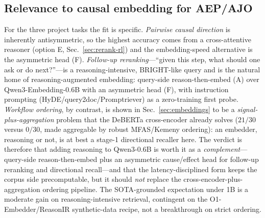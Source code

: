 \subsection{Relevance to causal embedding for AEP/AJO}
For the three project tasks the fit is specific. \emph{Pairwise causal direction} is
inherently antisymmetric, so the highest accuracy comes from a cross-attentive reasoner
(option E, Sec.~\ref{sec:rerank-rl}) and the embedding-speed alternative is the
asymmetric head (F). \emph{Follow-up reranking}---``given this step, what should one ask
or do next?''---is a reasoning-intensive, BRIGHT-like query and is the natural home of
reasoning-augmented embedding: query-side reason-then-embed (A) over Qwen3-Embedding-0.6B
with an asymmetric head (F), with instruction prompting (HyDE/query2doc/Promptriever) as
a zero-training first probe. \emph{Workflow ordering}, by contrast, is shown in
Sec.~\ref{sec:embeddings} to be a \emph{signal-plus-aggregation} problem that the
DeBERTa cross-encoder already solves ($21/30$ versus $0/30$, made aggregable by robust
MFAS/Kemeny ordering): an embedder, reasoning or not, is at best a stage-1 directional
recaller here. The verdict is therefore that adding reasoning to Qwen3-0.6B is worth it
as a \emph{complement}---query-side reason-then-embed plus an asymmetric cause/effect
head for follow-up reranking and directional recall---and that the latency-disciplined
form keeps the corpus side precomputable, but it should \emph{not} replace the
cross-encoder-plus-aggregation ordering pipeline. The SOTA-grounded expectation under
1B is a moderate gain on reasoning-intensive retrieval, contingent on the
O1-Embedder/ReasonIR synthetic-data recipe, not a breakthrough on strict ordering.

